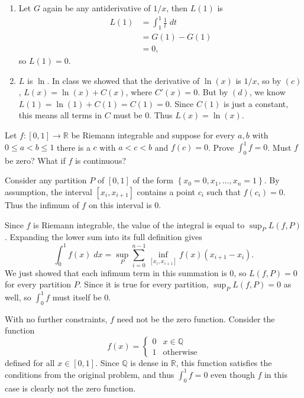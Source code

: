 \documentclass[10pt]{amsart}
\newenvironment{exercise}[1]{%
        \vspace{10mm}
        \renewcommand\themanualtheoreminner{#1}%
  \manualtheoreminner
}\hrulefill{\endmanualtheoreminner}
\begin{document}
\begin{enumerate}
	\item Let $G$ again be any antiderivative of $1/x$, then $L(1)$ is
		\begin{align*}
			L(1) &= \int_{1}^{1} \frac{1}{t} \;d t \\
			     &= G(1) - G(1) \\
			     &= 0,
		\end{align*}
		so $L(1) = 0$.

	\item $L$ is $\ln$. In class we showed that the derivative of $\ln(x)$ is $1/x$, so by $(c)$, $L(x) = \ln(x) + C(x)$, where $C'(x)=0$. But by $(d)$, we know $L(1) = \ln(1) + C(1) = C(1) = 0$. Since $C(1)$ is just a constant, this means all terms in $C$ must be 0. Thus $L(x) = \ln(x)$.
\end{enumerate}


\begin{exercise}{Page 236, Exercise 4.44}
	Let $f:[0,1] \to \mathbb{R}$ be Riemann integrable and suppose for every $a,b$ with $0 \leq a < b \leq 1$ there is a $c$ with $a < c < b$ and $f(c) = 0$. Prove $\int_{0}^{1} f = 0$. Must $f$ be zero? What if $f$ is continuous?
\end{exercise}

Consider any partition $P$ of $[0,1]$ of the form $\left\{ x_0=0, x_1, \dots, x_n=1 \right\}$. By assumption, the interval $[x_i, x_{i+1}]$ contains a point $c_i$ such that $f(c_i) = 0$. Thus the infimum of $f$ on this interval is 0.

Since $f$ is Riemann integrable, the value of the integral is equal to $\sup_P L(f,P)$. Expanding the lower sum into its full definition gives
\[
	\int_{0}^{1} f(x) \;dx  = \sup_P \sum_{i=0}^{n-1} \inf_{[x_i, x_{i+1}]} f(x) (x_{i+1} - x_i).
\] We just showed that each infimum term in this summation is 0, so $L(f,P) = 0$ for every partition $P$. Since it is true for every partition, $\sup_P L(f,P) = 0$ as well, so $\int_{0}^{1} f$ must itself be 0.

With no further constraints, $f$ need not be the zero function. Consider the function
\[
	f(x) =
	\begin{cases}
		0 & x \in \mathbb{Q} \\
		1 & \text{otherwise}
	\end{cases}
\] defined for all $x \in [0,1]$. Since $\mathbb{Q}$ is dense in $\mathbb{R}$, this function satisfies the conditions from the original problem, and thus $\int_{0}^{1} f = 0$ even though $f$ in this case is clearly not the zero function.
\end{document}
